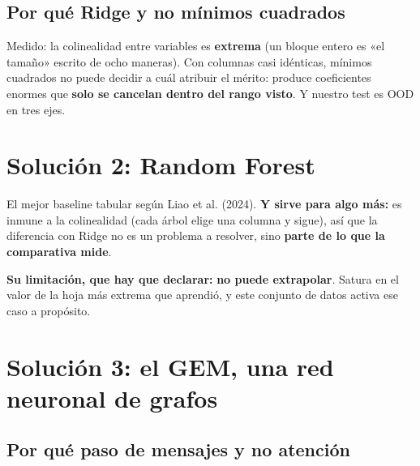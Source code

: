 \subsection{Por qué Ridge y no mínimos cuadrados}
Medido: la colinealidad entre variables es \textbf{extrema} (un bloque entero es «el tamaño»
escrito de ocho maneras). Con columnas casi idénticas, mínimos cuadrados no puede decidir a
cuál atribuir el mérito: produce coeficientes enormes que \textbf{solo se cancelan dentro del
rango visto}. Y nuestro test es OOD en tres ejes.

\section{Solución 2: Random Forest}
\label{sec:rf}
El mejor baseline tabular según Liao et al. (2024). \textbf{Y sirve para algo más:} es inmune
a la colinealidad (cada árbol elige una columna y sigue), así que la diferencia con Ridge no
es un problema a resolver, sino \textbf{parte de lo que la comparativa mide}.

\textbf{Su limitación, que hay que declarar:} \textbf{no puede extrapolar}. Satura en el valor
de la hoja más extrema que aprendió, y este conjunto de datos activa ese caso a propósito.

\section{Solución 3: el GEM, una red neuronal de grafos}
\label{sec:gem}

\subsection{Por qué paso de mensajes y no atención}

